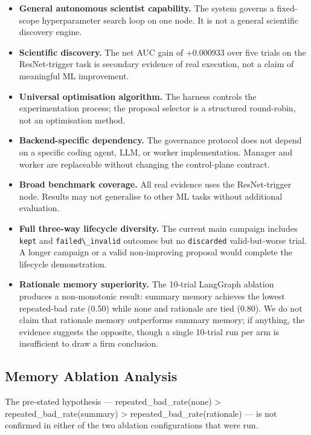 \begin{itemize}
\tightlist
\item
  \textbf{General autonomous scientist capability.} The system governs a fixed-scope hyperparameter search loop on one node. It is not a general scientific discovery engine.
\item
  \textbf{Scientific discovery.} The net AUC gain of +0.000933 over five trials on the ResNet-trigger task is secondary evidence of real execution, not a claim of meaningful ML improvement.
\item
  \textbf{Universal optimisation algorithm.} The harness controls the experimentation process; the proposal selector is a structured round-robin, not an optimisation method.
\item
  \textbf{Backend-specific dependency.} The governance protocol does not depend on a specific coding agent, LLM, or worker implementation. Manager and worker are replaceable without changing the control-plane contract.
\item
  \textbf{Broad benchmark coverage.} All real evidence uses the ResNet-trigger node. Results may not generalise to other ML tasks without additional evaluation.
\item
  \textbf{Full three-way lifecycle diversity.} The current main campaign includes \passthrough{\lstinline!kept!} and \passthrough{\lstinline!failed\_invalid!} outcomes but no \passthrough{\lstinline!discarded!} valid-but-worse trial. A longer campaign or a valid non-improving proposal would complete the lifecycle demonstration.
\item
  \textbf{Rationale memory superiority.} The 10-trial LangGraph ablation produces a non-monotonic result: summary memory achieves the lowest repeated-bad rate (0.50) while none and rationale are tied (0.80). We do not claim that rationale memory outperforms summary memory; if anything, the evidence suggests the opposite, though a single 10-trial run per arm is insufficient to draw a firm conclusion.
\end{itemize}

\subsection{Memory Ablation Analysis}\label{memory-ablation-analysis}

The pre-stated hypothesis --- repeated\_bad\_rate(none) \textgreater{} repeated\_bad\_rate(summary) \textgreater{} repeated\_bad\_rate(rationale) --- is not confirmed in either of the two ablation configurations that were run.

